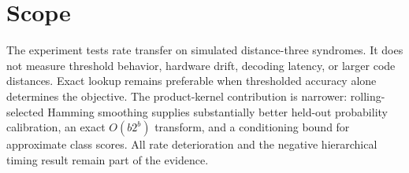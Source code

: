 \documentclass[10pt,letterpaper,twoside]{article}
\begin{document}
\section{Scope}

The experiment tests rate transfer on simulated distance-three syndromes.
It does not measure threshold behavior, hardware drift, decoding latency, or
larger code distances. Exact lookup remains preferable when thresholded
accuracy alone determines the objective. The product-kernel contribution is
narrower: rolling-selected Hamming smoothing supplies substantially better
held-out probability calibration, an exact $O(b2^b)$ transform, and a
conditioning bound for approximate class scores. All rate deterioration and
the negative hierarchical timing result remain part of the evidence.



\end{document}
